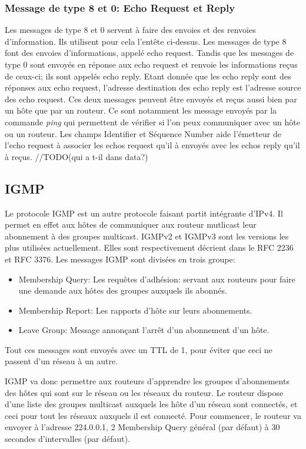 \subsubsection{Message de type 8 et 0: Echo Request et Reply} Les messages de type 8 et 0 servent à
faire des envoies et des renvoies d'information. Ils utilisent pour cela
l'entête ci-dessus. Les messages de type 8 font des envoies d'informations,
appelé echo request. Tandis que les messages de type 0 sont envoyés en réponse
aux echo request et renvoie les informations reçus de ceux-ci; ils sont appelés
echo reply. Etant donnée que les echo reply sont des réponses aux echo request,
l'adresse destination des echo reply est l'adresse source des echo request. Ces
deux messages peuvent être envoyés et reçus aussi bien par un hôte que par un
routeur. Ce sont notamment les message envoyés par la commande {\it ping} qui
permettent de vérifier si l'on peux communiquer avec un hôte ou un routeur.  Les
champs Identifier et Séquence Number aide l'émetteur de l'echo request à
associer les echos request qu'il à envoyés avec les echos reply qu'il à reçus.
//TODO(qui a t-il dans data?)

\subsection{IGMP}
Le protocole IGMP est un autre protocole faisant partit intégrante d'IPv4. Il permet en effet aux hôtes
de communiquer aux routeur mutlicast leur abonnement à des groupes multicast.
IGMPv2 et IGMPv3 sont les versions les plus utilisées actuellement. Elles sont
respectivement décrient dans le RFC 2236 et RFC 3376.
Les messages IGMP sont divisées en trois groupe:
\begin{itemize}
\item Membership Query: Les requêtes d'adhésion: servant aux routeurs pour faire
une demande aux hôtes des groupes auxquels ils abonnés.
\item Membership Report: Les rapports d'hôte sur leurs abonnements.
\item Leave Group: Message annonçant l'arrêt d'un abonnement d'un hôte.
\end{itemize}
Tout ces messages sont envoyés avec un TTL de 1, pour éviter que ceci ne passent
d'un réseau à un autre.

IGMP va donc permettre aux routeurs d'apprendre les groupes d'abonnements des hôtes qui
sont sur le réseau ou les réseaux du routeur.
Le routeur dispose d'une liste des groupes multicast auxquels les hôte d'un réseau sont connectés,
et ceci pour tout les réseaux auxquels il est connecté.
Pour commencer, le routeur va envoyer à l'adresse 224.0.0.1, 2 Membership Query général
(par défaut) à 30 secondes d'intervalles (par défaut).

